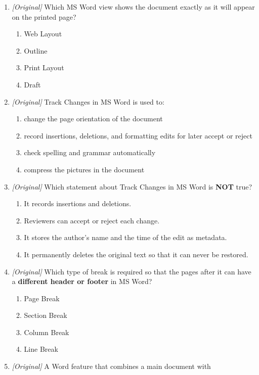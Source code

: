 \documentclass[11pt]{article}
\begin{document}
\begin{enumerate}[label=\textbf{Q\arabic*.}, leftmargin=*]
\begin{enumerate}[label=\Alph*.]
  \end{enumerate}
\item \textit{[Original]} Which MS Word view shows the document exactly as it
  will appear on the printed page?
  \begin{enumerate}[label=\Alph*.]
    \item Web Layout
    \item Outline
    \item Print Layout
    \item Draft
  \end{enumerate}
\item \textit{[Original]} Track Changes in MS Word is used to:
  \begin{enumerate}[label=\Alph*.]
    \item change the page orientation of the document
    \item record insertions, deletions, and formatting edits for later
      accept or reject
    \item check spelling and grammar automatically
    \item compress the pictures in the document
  \end{enumerate}
\item \textit{[Original]} Which statement about Track Changes in MS Word is
  \textbf{NOT} true?
  \begin{enumerate}[label=\Alph*.]
    \item It records insertions and deletions.
    \item Reviewers can accept or reject each change.
    \item It stores the author's name and the time of the edit as metadata.
    \item It permanently deletes the original text so that it can never be
      restored.
  \end{enumerate}
\item \textit{[Original]} Which type of break is required so that the pages
  after it can have a \textbf{different header or footer} in MS Word?
  \begin{enumerate}[label=\Alph*.]
    \item Page Break
    \item Section Break
    \item Column Break
    \item Line Break
  \end{enumerate}
\item \textit{[Original]} A Word feature that combines a main document with

\end{enumerate}
\end{document}

